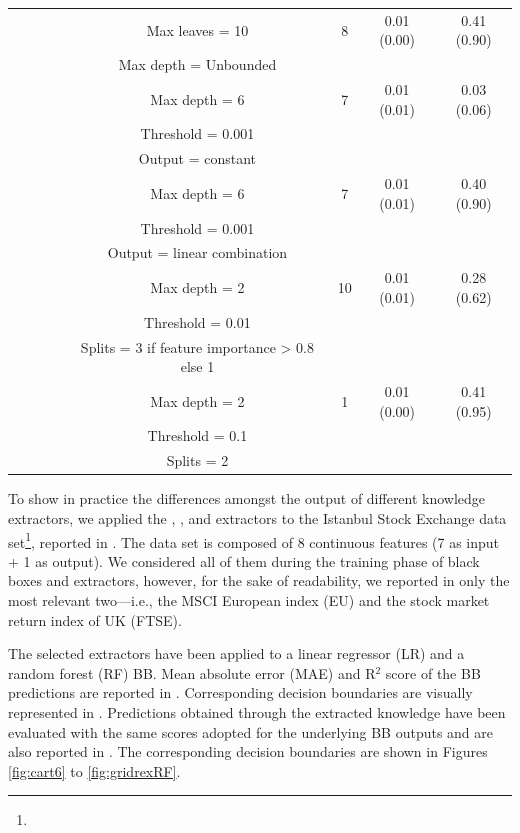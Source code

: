 \documentclass[sigconf]{acmart}
\begin{document}
\begin{table}[t]
\begin{tabular}{cccccccc}
		\cmidrule(lr){4-8}
		& & & \cart{} & Max leaves = 10 & 8 & 0.01 (0.00) & 0.41 (0.90) \\
		& & & & Max depth = Unbounded & & & \\
		\cmidrule(lr){4-8}
		& & & \creepy{} & Max depth = 6 & 7 & 0.01 (0.01) & 0.03 (0.06) \\
		& & & & Threshold = 0.001 & & & \\
		& & & & Output = constant & & & \\
		\cmidrule(lr){4-8}
		& & & \creepy{} & Max depth = 6 & 7 & 0.01 (0.01) & 0.40 (0.90) \\
		& & & & Threshold = 0.001 & & & \\
		& & & & Output = linear combination & & & \\
		\cmidrule(lr){4-8}
		& & & \gridex{} & Max depth = 2 & 10 & 0.01 (0.01) & 0.28 (0.62) \\
		& & & & Threshold = 0.01 & & & \\
		& & & & Splits = 3 if feature importance > 0.8 else 1 & & & \\
		\cmidrule(lr){4-8}
		& & & \gridrex{} & Max depth = 2 & 1 & 0.01 (0.00) & 0.41 (0.95) \\
		& & & & Threshold = 0.1 & & & \\
		& & & & Splits = 2 & & & \\
		\bottomrule
	\end{tabular}
\end{table}

To show in practice the differences amongst the output of different knowledge extractors, we applied the \cart{}, \creepy{}, \gridex{} and \gridrex{} extractors to the Istanbul Stock Exchange data set\footnote{}, reported in .
%
The data set is composed of 8 continuous features (7 as input + 1 as output).
%
We considered all of them during the training phase of black boxes and extractors, however, for the sake of readability,  we reported in  only the most relevant two---i.e., the MSCI European index (EU) and the stock market return index of UK (FTSE).

The selected extractors have been applied to a linear regressor (LR) and a random forest (RF) BB.
%
Mean absolute error (MAE) and R$^2$ score of the BB predictions are reported in .
%
Corresponding decision boundaries are visually represented in .
%
Predictions obtained through the extracted knowledge have been evaluated with the same scores adopted for the underlying BB outputs and are also reported in .
%
The corresponding decision boundaries are shown in Figures \ref{fig:cart6} to \ref{fig:gridrexRF}.
\end{document}
